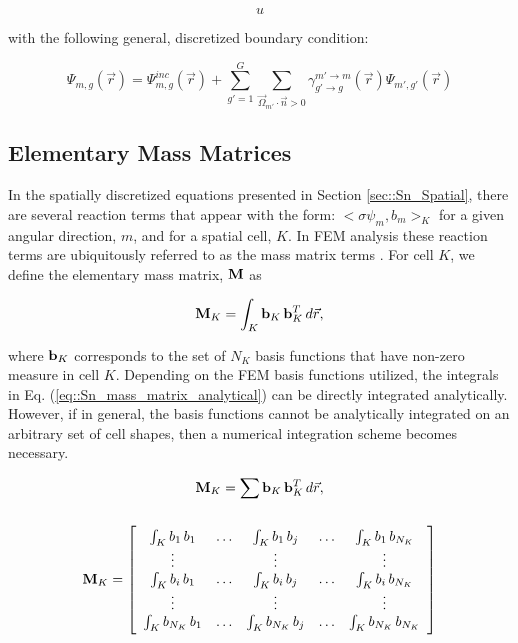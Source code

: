 \begin{equation}
\label{eq::Sn_mg_sn_trans_eq}
u
\end{equation}

\noindent with the following general, discretized boundary condition:

\begin{equation}
\label{eq::Sn_mg_sn_trans_eq_bc}
\Psi_{m,g} (\vec{r}) = \Psi^{inc}_{m,g} (\vec{r}) + \sum_{g'=1}^{G} \sum_{\vec{\Omega}_{m'} \cdot \vec{n} > 0} \gamma_{g' \rightarrow g}^{m' \rightarrow m} (\vec{r})  \Psi_{m',g'} (\vec{r}) 
\end{equation}

\subsection{Elementary Mass Matrices}
\label{sec::Sn_Spatial_Mass}

In the spatially discretized equations presented in Section \ref{sec::Sn_Spatial}, there are several reaction terms that appear with the form: $\Big< \sigma \psi_m, b_m  \Big>_K$ for a given angular direction, $m$, and for a spatial cell, $K$. In FEM analysis these reaction terms are ubiquitously referred to as the mass matrix terms \cite{zeinkiewicz2005finite}. For cell $K$, we define the elementary mass matrix, ${\bf M}$ as

\begin{equation}
\label{eq::Sn_mass_matrix_analytical}
{\bf M}_K =    \int_K {\bf b}_K \, {\bf b}_K^T \, d {\vec{r}} ,
\end{equation}

\noindent where ${\bf b}_K$ corresponds to the set of $N_K$ basis functions that have non-zero measure in cell $K$. Depending on the FEM basis functions utilized, the integrals in Eq. (\ref{eq::Sn_mass_matrix_analytical}) can be directly integrated analytically. However, if in general, the basis functions cannot be analytically integrated on an arbitrary set of cell shapes, then a numerical integration scheme becomes necessary. 

\begin{equation}
\label{eq::Sn_mass_matrix_numerical}
{\bf M}_K =    \sum_{} {\bf b}_K \, {\bf b}_K^T \, d {\vec{r}} ,
\end{equation}


\begin{equation}
\label{eq::Sn_mass_matrix_array}
{\bf M}_K =   \left[
\begin{array} {ccccc}
	\int_K b_1 \, b_1  & \ldots & \int_K b_1 \, b_j  & \ldots & \int_K b_1 \, b_{N_K} \\
	\vdots  &  & \vdots  &  & \vdots \\
	\int_K b_i \, b_1  & \ldots & \int_K b_i \, b_j  & \ldots & \int_K b_i \, b_{N_K} \\
	\vdots  &  & \vdots  &  & \vdots \\
	\int_K b_{N_K} \, b_1  & \ldots & \int_K b_{N_K} \, b_j  & \ldots & \int_K b_{N_K} \, b_{N_K} \\
\end{array}
\right]
\end{equation}


